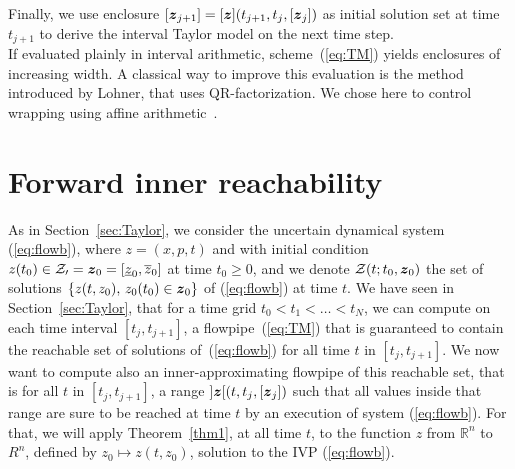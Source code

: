 \documentclass{sig-alternate-05-2015} %
\newcommand\ForAuthors[1]%
 {\par\smallskip                     %
  \begin{center}%
   \fbox%
   {\parbox{0.9\linewidth}%
    {\raggedright\sc--- #1}%
   }%
  \end{center}%
  \par\smallskip                     %
 }
\def\R{{\mathbb R}}
\newcommand{\addTODO}[1]{\addcontentsline{tdo}{toc}{#1}}
\newcommand{\TODO}[1]{{\bf{\scriptsize #1}\addTODO{#1}}}
\newcommand{\SP}[1]{\TODO{Sylvie : #1}}
\begin{document}

Finally, we use enclosure $[{\z}_{j+1}]=[\z](t_{j+1},t_j,[{\z}_j])$ as initial solution set at time $t_{j+1}$ to derive the interval Taylor model on the next time step. \\

If evaluated plainly in interval arithmetic, scheme~(\ref{eq:TM}) yields enclosures of increasing width. A classical way to improve 
this evaluation is the method introduced by Lohner, that uses QR-factorization.
We chose here to control wrapping using affine arithmetic~\cite{com-sto-93-aa}. 

\section{Forward inner reachability}
\label{sec:inner_reachability}

As in Section~\ref{sec:Taylor}, we consider the uncertain dynamical system (\ref{eq:flowb}), where $z=(x,p,t)$ and with initial condition 
$z(t_0) \in {\cal Z_0} = \z_0=[\underline{z}_0,\overline{z}_0]$ at time $t_0 \geq 0$, and we denote ${\cal Z}(t;t_0, \z_0)$
 the set of solutions $\{ z(t,z_0), \, z_0(t_0) \in \z_0 \}$ of  (\ref{eq:flowb}) at time $t$. 
We have seen in  Section~\ref{sec:Taylor}, that for a  time grid $t_0 < t_1 < \ldots < t_N$, we can compute on each time interval  $[t_j,t_{j+1}]$,
a flowpipe~(\ref{eq:TM}) 
that is guaranteed to contain the reachable set of solutions of~(\ref{eq:flowb}) for all time $t$ in $[t_j,t_{j+1}]$. 
We now want to compute also an inner-approximating flowpipe of this reachable set, that is for all $t$ in $[t_j,t_{j+1}]$, 
a range $]\z[(t,t_j,[\z_j])$ such that all values inside that range are sure to be reached at time $t$ by an execution of system (\ref{eq:flowb}).
For that, we will apply Theorem~\ref{thm1}, at all time $t$, to the function $z$ from $\R^n$ to $R^n$, defined by 
$z_0 \mapsto z(t,z_0)$, solution to the IVP (\ref{eq:flowb}). 
\end{document}
